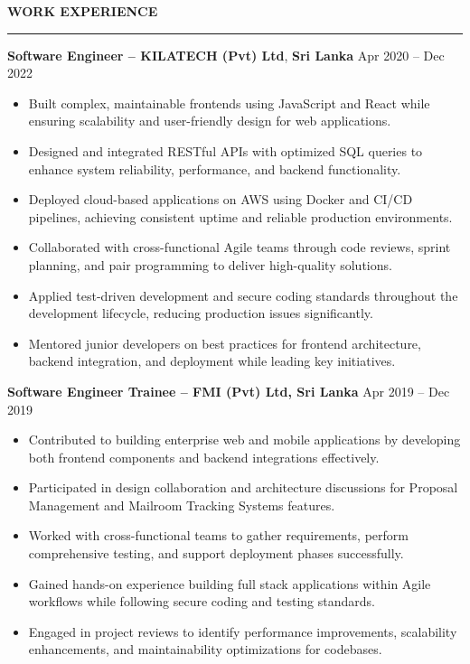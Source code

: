 \documentclass[10pt,letterpaper]{article}
\begin{document}
\vspace{8pt}

\textbf{WORK EXPERIENCE}\\[-8pt]
\noindent\rule{\textwidth}{1pt}

\vspace{-2pt}

\textbf{Software Engineer -- KILATECH (Pvt) Ltd}, \textbf{Sri Lanka} \hfill Apr 2020 -- Dec 2022

\vspace{-1pt}

\begin{itemize}
\item Built complex, maintainable frontends using JavaScript and React while ensuring scalability and user-friendly design for web applications.
\item Designed and integrated RESTful APIs with optimized SQL queries to enhance system reliability, performance, and backend functionality.
\item Deployed cloud-based applications on AWS using Docker and CI/CD pipelines, achieving consistent uptime and reliable production environments.
\item Collaborated with cross-functional Agile teams through code reviews, sprint planning, and pair programming to deliver high-quality solutions.
\item Applied test-driven development and secure coding standards throughout the development lifecycle, reducing production issues significantly.
\item Mentored junior developers on best practices for frontend architecture, backend integration, and deployment while leading key initiatives.
\end{itemize}

\textbf{Software Engineer Trainee -- FMI (Pvt) Ltd, Sri Lanka} \hfill Apr 2019 -- Dec 2019

\vspace{-1pt}

\begin{itemize}
\item Contributed to building enterprise web and mobile applications by developing both frontend components and backend integrations effectively.
\item Participated in design collaboration and architecture discussions for Proposal Management and Mailroom Tracking Systems features.
\item Worked with cross-functional teams to gather requirements, perform comprehensive testing, and support deployment phases successfully.
\item Gained hands-on experience building full stack applications within Agile workflows while following secure coding and testing standards.
\item Engaged in project reviews to identify performance improvements, scalability enhancements, and maintainability optimizations for codebases.
\end{itemize}
\end{document}
